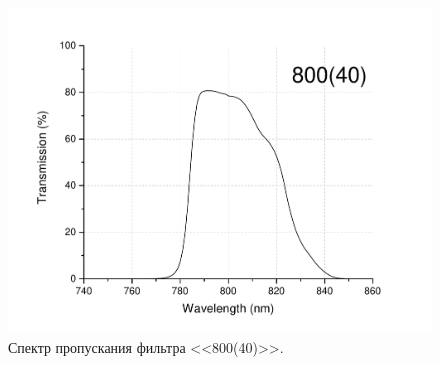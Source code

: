 \documentclass[12pt,a5paper]{article}
\numberwithin{equation}{section}
\begin{document}
\begin{figure}[]
  \begin{center}
  \includegraphics[width=\linewidth]{filters_spectra/800_40_2.pdf}
  \caption{Спектр пропускания фильтра <<800(40)>>. }\label{fig:800(40)}
  \end{center}
  \end{figure}


\newpage
\section{\refname}
\renewcommand{\refname}{}


\end{document}
